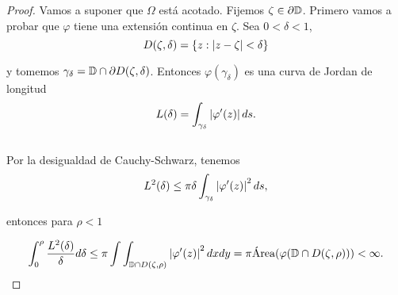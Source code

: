 \begin{proof}
    Vamos a suponer que $\Omega$ está acotado. Fijemos $\zeta \in \partial \mathbb{D}$. Primero vamos a probar que $\varphi$ tiene una extensión continua en $\zeta$. Sea $0 < \delta < 1$,
    \begin{equation*}
        D(\zeta, \delta) = \{z: \left\lvert z - \zeta\right\rvert < \delta \}
    \end{equation*}

    y tomemos $\gamma_{\delta} = \mathbb{D} \cap \partial D(\zeta, \delta)$. Entonces $\varphi (\gamma_{\delta})$ es una curva de Jordan de longitud
    \begin{equation*}
        L(\delta) = \int_{\gamma_{\delta}} \left\lvert\varphi ' (z)\right\rvert ds.
    \end{equation*}
    \\
    Por la desigualdad de Cauchy-Schwarz, tenemos
    \begin{equation*}
        L^2(\delta) \leq \pi \delta \int_{\gamma_{\delta}} \left\lvert\varphi ' (z)\right\rvert^2 ds,
    \end{equation*}

    entonces para $\rho < 1$

    \begin{equation*}
        \int_{0}^{\rho} \frac{L^2(\delta)}{\delta} d\delta \leq \pi \int \int_{\mathbb{D} \cap D(\zeta, \rho)} \left\lvert\varphi ' (z)\right\rvert^2 dxdy = \pi \text{Área}(\varphi(\mathbb{D} \cap D(\zeta, \rho))) < \infty.
    \end{equation*}


\end{proof}

